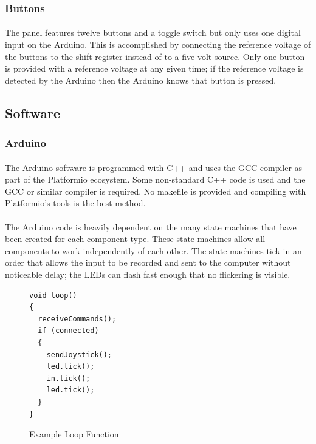 \documentclass[12pt,a4paper]{article}
\begin{document}
\subsubsection{Buttons}
\paragraph{}
The panel features twelve buttons and a toggle switch but only uses one digital input on the Arduino. This is accomplished by connecting the reference voltage of the buttons to the shift register instead of to a five volt source. Only one button is provided with a reference voltage at any given time; if the reference voltage is detected by the Arduino then the Arduino knows that button is pressed.
\subsection{Software}
\subsubsection{Arduino}
\paragraph{}
The Arduino software is programmed with C++ and uses the \gls{GCC} compiler as part of the Platformio ecosystem. Some non-standard C++ code is used and the \gls{GCC} or similar compiler is required. No makefile is provided and compiling with Platformio's tools is the best method.
\paragraph{}
The Arduino code is heavily dependent on the many state machines that have been created for each component type. These state machines allow all components to work independently of each other. The state machines tick in an order that allows the input to be recorded and sent to the computer without noticeable delay; the \glspl{LED} can flash fast enough that no flickering is visible.
\begin{figure}[h!]
	\caption{Example Loop Function}
	\lstset{escapechar=@,style=customc}
	\begin{lstlisting}
void loop()
{
  receiveCommands();
  if (connected)
  {
    sendJoystick();
    led.tick();
    in.tick();
    led.tick();
  }
}
	\end{lstlisting}
	\label{fig:fnc_loop}
\end{figure}
\end{document}
